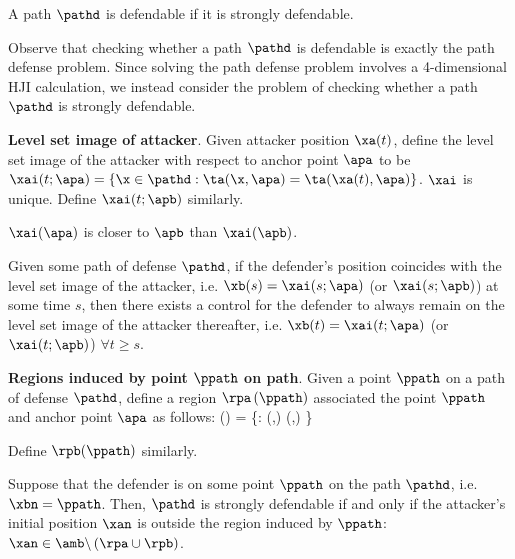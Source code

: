 \begin{rem}
A path $\pathd$ is defendable if it is strongly defendable.
\end{rem}

Observe that checking whether a path $\pathd$ is defendable is exactly the path defense problem. Since solving the path defense problem involves a 4-dimensional HJI calculation, we instead consider the problem of checking whether a path $\pathd$ is strongly defendable.

\begin{defn} %
\textbf{Level set image of attacker}. Given attacker position $\xa(t)$, define the level set image of the attacker with respect to anchor point $\apa$ to be $\xai(t;\apa) = \{\x\in\pathd: \ta(\x,\apa) = \ta(\xa(t),\apa)\}$. $\xai$ is unique. Define $\xai(t;\apb)$ similarly.
\end{defn}

\begin{rem}
\label{rem:image_of_a}
$\xai(\apa)$ is closer to $\apb$ than $\xai(\apb)$.
\end{rem}

\begin{rem}
Given some path of defense $\pathd$, if the defender's position coincides with the level set image of the attacker, i.e. $\xb(s) = \xai(s;\apa)$ (or $\xai(s;\apb)$) at some time $s$, then there exists a control for the defender to always remain on the level set image of the attacker thereafter, i.e. $\xb(t) = \xai(t;\apa)$ (or $\xai(t;\apb)$) $\forall t\ge s$.
\end{rem}

\begin{defn} %
\label{def:d_win_region}
\textbf{Regions induced by point $\ppath$ on path}. Given a point $\ppath$ on a path of defense $\pathd$, define a region $\rpa\left(\ppath\right)$ associated the point $\ppath$ and anchor point $\apa$ as follows:
\bq
\rpa\left(\ppath\right) = \left\{\x: \ta(\x,\apa) \leq \tb(\ppath,\apa) \right\}
\eq

Define $\rpb(\ppath)$ similarly.
\end{defn}

\begin{lem}
\label{lem:d_winning_region}
Suppose that the defender is on some point $\ppath$ on the path $\pathd$, i.e. $\xbn = \ppath$. Then, $\pathd$ is strongly defendable if and only if the attacker's initial position $\xan$ is outside the region induced by $\ppath$: $\xan\in\amb\backslash\left(\rpa \cup \rpb\right)$.
\end{lem}

